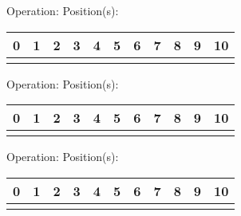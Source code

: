 \documentclass[12pt]{article}
\begin{document}
{{\begin{center}
            \end{center}
            Operation: \underline{\hspace{3cm}} \hspace{10px} Position(s): \underline{\hspace{2cm}}
            \begin{center}
                \begin{tabular}{|P{0.75cm}|P{0.75cm}|P{0.75cm}|P{0.75cm}|P{0.75cm}|P{0.75cm}|P{0.75cm}|P{0.75cm}|P{0.75cm}|P{0.75cm}|P{0.75cm}|}
                     & 1 & 2 & 3 & 4 & 5 & 6 & 7 & 8 & 9 & 10  \\
                    \hline
                    &&&&&&&&&& \\
                    \hline
                \end{tabular}
            \end{center}
            Operation: \underline{\hspace{3cm}} \hspace{10px} Position(s): \underline{\hspace{2cm}}
            \begin{center}
                \begin{tabular}{|P{0.75cm}|P{0.75cm}|P{0.75cm}|P{0.75cm}|P{0.75cm}|P{0.75cm}|P{0.75cm}|P{0.75cm}|P{0.75cm}|P{0.75cm}|P{0.75cm}|}
                     & 1 & 2 & 3 & 4 & 5 & 6 & 7 & 8 & 9 & 10  \\
                    \hline
                    &&&&&&&&&& \\
                    \hline
                \end{tabular}
            \end{center}
            Operation: \underline{\hspace{3cm}} \hspace{10px} Position(s): \underline{\hspace{2cm}}
            \begin{center}
                \begin{tabular}{|P{0.75cm}|P{0.75cm}|P{0.75cm}|P{0.75cm}|P{0.75cm}|P{0.75cm}|P{0.75cm}|P{0.75cm}|P{0.75cm}|P{0.75cm}|P{0.75cm}|}
                     & 1 & 2 & 3 & 4 & 5 & 6 & 7 & 8 & 9 & 10  \\
                    \hline
                    &&&&&&&&&& \\
                    \hline
                \end{tabular}

\end{center}}}
\end{document}

